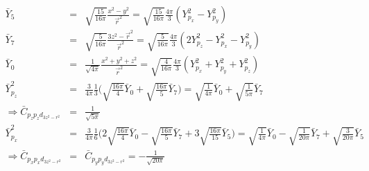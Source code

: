 \documentclass[11pt,a4paper]{report}
\begin{document}
\begin{eqnarray*}
\bar{Y}_5&=&\sqrt{\frac{15}{16\pi}}\frac{x^2-y^2}{\vec{r}^2}
=\sqrt{\frac{15}{16\pi}}\frac{4\pi}{3}(Y_{p_x}^2-Y_{p_y}^2)
\\
\bar{Y}_7&=&\sqrt{\frac{5}{16\pi}}\frac{3z^2-\vec{r}^2}{\vec{r}^2}=
\sqrt{\frac{5}{16\pi}}\frac{4\pi}{3}(2Y_{p_z}^2-Y_{p_x}^2-Y_{p_y}^2)
\\
\bar{Y}_0&=&\frac{1}{\sqrt{4\pi}}\frac{x^2+y^2+z^2}{\vec{r}^2}
=\sqrt{\frac{4}{16\pi}}\frac{4\pi}{3}(Y_{p_x}^2+Y_{p_y}^2+Y_{p_z}^2)
\\
\bar{Y}_{p_z}^2&=&\frac{3}{4\pi}\frac{1}{3}\biggl(\sqrt{\frac{16\pi}{4}}\bar{Y}_0+\sqrt{\frac{16\pi}{5}}\bar{Y}_7\biggr)
=\sqrt{\frac{1}{4\pi}}\bar{Y}_0+\sqrt{\frac{1}{5\pi}}\bar{Y}_7
\\
\Rightarrow \bar{C}_{p_zp_zd_{3z^2-r^2}}&=&\frac{1}{\sqrt{5\pi}}
\\
\bar{Y}_{p_x}^2
&=&\frac{3}{4\pi}\frac{1}{6}
\biggl(2\sqrt{\frac{16\pi}{4}}\bar{Y}_0-\sqrt{\frac{16\pi}{5}}\bar{Y}_7+3\sqrt{\frac{16\pi}{15}}\bar{Y}_5\biggr)
=
\sqrt{\frac{1}{4\pi}}\bar{Y}_0-\sqrt{\frac{1}{20\pi}}\bar{Y}_7+\sqrt{\frac{3}{20\pi}}\bar{Y}_5
\\
\Rightarrow \bar{C}_{p_xp_xd_{3z^2-r^2}}&=&\bar{C}_{p_yp_yd_{3z^2-r^2}}=-\frac{1}{\sqrt{20\pi}}
\end{eqnarray*}
\end{document}
